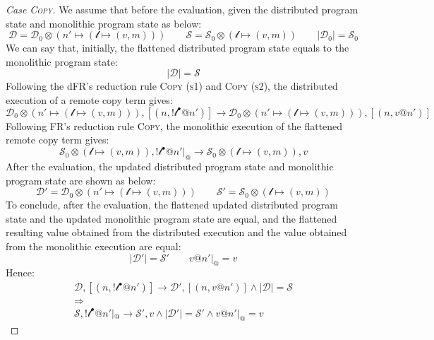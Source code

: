\begin{proof}[Case \textsc{\emph{Copy}}]
We assume that before the evaluation, given the distributed program state and monolithic program state as below:
\[\mathcal{D} = \mathcal{D}_0 \otimes (n' \mapsto (\mathscr{l}\mapsto (v, m)))\quad\quad
\mathcal{S} = \mathcal{S}_0 \otimes (\mathscr{l} \mapsto (v, m)) \quad\quad |\mathcal{D}_0| = \mathcal{S}_0\]
We can say that, initially, the flattened distributed program state equals to the monolithic program state: 
\[|\mathcal{D}| = \mathcal{S}\]
Following the dFR's reduction rule \textsc{Copy (s1)} and \textsc{Copy (s2)}, the distributed execution of a remote copy term gives:
\[\mathcal{D}_0 \otimes (n' \mapsto (\mathscr{l} \mapsto (v,m))) , [(n, !\mathscr{l}^\bullet@n')] \longrightarrow \mathcal{D}_0 \otimes (n' \mapsto (\mathscr{l} \mapsto (v, m))), [(n, v@n')]\]
Following FR's reduction rule \textsc{Copy}, the monolithic execution of the flattened remote copy term gives:
\[\mathcal{S}_0 \otimes (\mathscr{l} \mapsto (v, m)), !\mathscr{l}^\bullet@n'|_@ \longrightarrow \mathcal{S}_0 \otimes (\mathscr{l} \mapsto (v, m)), v\]
After the evaluation, the updated distributed program state and monolithic program state are shown as below:
\[\mathcal{D}' = \mathcal{D}_0 \otimes (n' \mapsto (\mathscr{l} \mapsto (v, m))) \quad\quad 
\mathcal{S}' = \mathcal{S}_0 \otimes (\mathscr{l} \mapsto (v, m))\]
To conclude, after the evaluation, the flattened updated distributed program state and the updated monolithic program state are equal, and the flattened resulting value obtained from the distributed execution and the value obtained from the monolithic execution are equal:
\[
|\mathcal{D}'| = \mathcal{S}' \quad\quad v@n'|_@ = v
\]
Hence:
\begin{gather*}
\mathcal{D}, [(n, !\mathscr{l}^\bullet@n')] \longrightarrow \mathcal{D'}, [(n, v@n')] \land |\mathcal{D}| = \mathcal{S} \\\Rightarrow\\ \mathcal{S},  !\mathscr{l}^\bullet@n'|_@ \longrightarrow \mathcal{S'}, v \land |\mathcal{D}'| = \mathcal{S}' \land v@n'|_@ = v
\end{gather*}



\end{proof}
